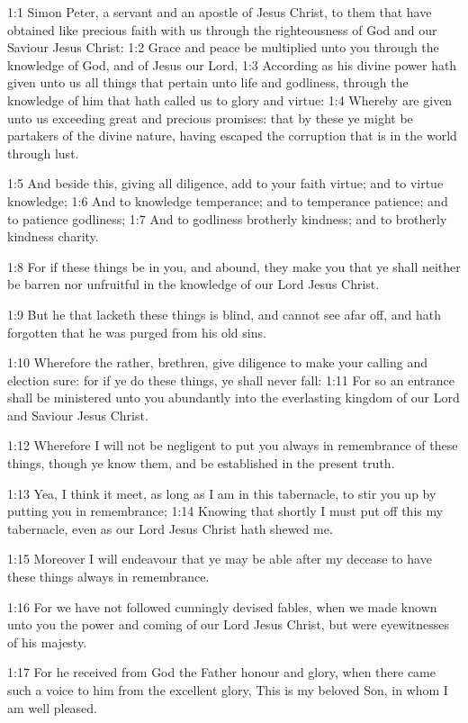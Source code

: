 

1:1 Simon Peter, a servant and an apostle of Jesus Christ, to them that have obtained like precious faith with us through the righteousness of God and our Saviour Jesus Christ: 1:2 Grace and peace be multiplied unto you through the knowledge of God, and of Jesus our Lord, 1:3 According as his divine power hath given unto us all things that pertain unto life and godliness, through the knowledge of him that hath called us to glory and virtue: 1:4 Whereby are given unto us exceeding great and precious promises: that by these ye might be partakers of the divine nature, having escaped the corruption that is in the world through lust.

1:5 And beside this, giving all diligence, add to your faith virtue; and to virtue knowledge; 1:6 And to knowledge temperance; and to temperance patience; and to patience godliness; 1:7 And to godliness brotherly kindness; and to brotherly kindness charity.

1:8 For if these things be in you, and abound, they make you that ye shall neither be barren nor unfruitful in the knowledge of our Lord Jesus Christ.

1:9 But he that lacketh these things is blind, and cannot see afar off, and hath forgotten that he was purged from his old sins.

1:10 Wherefore the rather, brethren, give diligence to make your calling and election sure: for if ye do these things, ye shall never fall: 1:11 For so an entrance shall be ministered unto you abundantly into the everlasting kingdom of our Lord and Saviour Jesus Christ.

1:12 Wherefore I will not be negligent to put you always in remembrance of these things, though ye know them, and be established in the present truth.

1:13 Yea, I think it meet, as long as I am in this tabernacle, to stir you up by putting you in remembrance; 1:14 Knowing that shortly I must put off this my tabernacle, even as our Lord Jesus Christ hath shewed me.

1:15 Moreover I will endeavour that ye may be able after my decease to have these things always in remembrance.

1:16 For we have not followed cunningly devised fables, when we made known unto you the power and coming of our Lord Jesus Christ, but were eyewitnesses of his majesty.

1:17 For he received from God the Father honour and glory, when there came such a voice to him from the excellent glory, This is my beloved Son, in whom I am well pleased.

